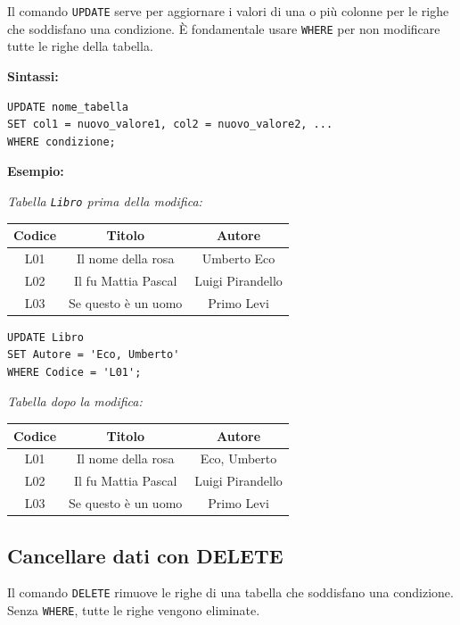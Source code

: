 \documentclass[a4paper,12pt]{article}
\newcommand{\code}[1]{\texttt{#1}}
\begin{document}
Il comando \code{UPDATE} serve per aggiornare i valori di una o più colonne per le righe che soddisfano una condizione. È fondamentale usare \code{WHERE} per non modificare tutte le righe della tabella. 

\textbf{Sintassi:}
\begin{verbatim}
UPDATE nome_tabella
SET col1 = nuovo_valore1, col2 = nuovo_valore2, ...
WHERE condizione;
\end{verbatim}

\textbf{Esempio:}

\textit{Tabella \texttt{Libro} prima della modifica:}
\begin{center}
\begin{tabular}{|c|c|c|}
\hline
Codice & Titolo & Autore \\
\hline
L01 & Il nome della rosa & Umberto Eco \\
L02 & Il fu Mattia Pascal & Luigi Pirandello \\
L03 & Se questo è un uomo & Primo Levi \\
\hline
\end{tabular}
\end{center}

\begin{verbatim}
UPDATE Libro
SET Autore = 'Eco, Umberto'
WHERE Codice = 'L01';
\end{verbatim}

\textit{Tabella dopo la modifica:}
\begin{center}
\begin{tabular}{|c|c|c|}
\hline
Codice & Titolo & Autore \\
\hline
L01 & Il nome della rosa & Eco, Umberto \\
L02 & Il fu Mattia Pascal & Luigi Pirandello \\
L03 & Se questo è un uomo & Primo Levi \\
\hline
\end{tabular}
\end{center}

\subsection{Cancellare dati con DELETE}

Il comando \code{DELETE} rimuove le righe di una tabella che soddisfano una condizione. Senza \code{WHERE}, tutte le righe vengono eliminate. 
\end{document}
